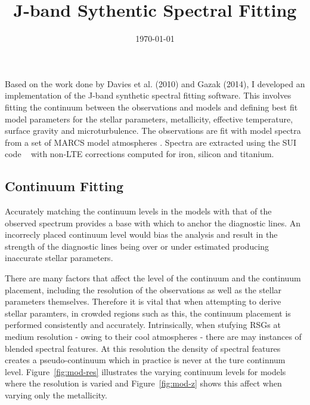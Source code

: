 \documentclass[12pt]{article}
\title{J-band Sythentic Spectral Fitting}
\date{\today}
\begin{document}
\maketitle

Based on the work done by Davies et al. (2010) and Gazak (2014), I developed an implementation of the J-band synthetic spectral fitting software.
This involves fitting the continuum between the observations and models and defining best fit model parameters for the stellar parameters,
metallicity, effective temperature, surface gravity and microturbulence.
The observations are fit with model spectra from a set of MARCS model atmospheres
\cite{2008A&A...486..951G}.
Spectra are extracted using the SUI code
~\cite{2012ApJ...751..156B,2013ApJ...764..115B,2014arXiv1412.6527B}
with non-LTE corrections computed for iron, silicon and titanium.

\subsection{Continuum Fitting} %
\label{sub:continuum_fitting}

Accurately matching the continuum levels in the models with that of the observed
spectrum provides a base with which to anchor the diagnostic lines.
An incorrecly placed continuum level would bias the analysis and result in the
strength of the diagnostic lines being over or under estimated producing inaccurate stellar parameters.

There are many factors that affect the level of the continuum and the continuum placement,
including the resolution of the observations as well as the stellar parameters themselves.
Therefore it is vital that when attempting to derive stellar paramters,
in crowded regions such as this, the continuum placement is performed
consistently and accurately.
Intrinsically, when stufying RSGs at medium resolution - owing  to their cool atmospheres -
there are may instances of blended spectral features.
At this resolution the density of spectral features creates a pseudo-continuum which in practice is never at the ture continnum level.
Figure~\ref{fig:mod-res} illustrates the varying continuum levels for models where the resolution is varied and
Figure~\ref{fig:mod-z} shows this affect when varying only the metallicity.
\end{document}
